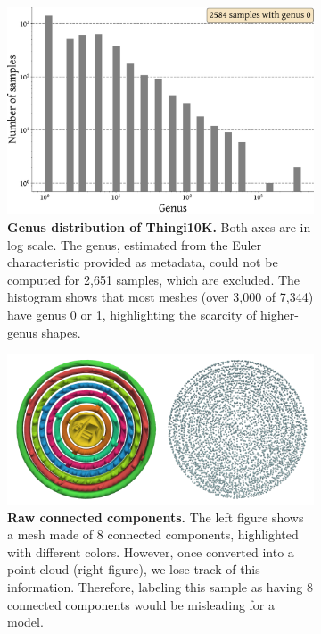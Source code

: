 \begin{figure}[h]
  \centering
  \begin{subfigure}[t]{0.40\linewidth}
    \centering
    \includegraphics[width=\linewidth]{figs/topogen/thingi_genus_hist.pdf}
    \caption{\textbf{Genus distribution of Thingi10K.} Both axes are in log scale. The genus, estimated from the Euler characteristic provided as metadata, could not be computed for 2,651 samples, which are excluded. The histogram shows that most meshes (over 3,000 of 7,344) have genus 0 or 1, highlighting the scarcity of higher-genus shapes.}
    \label{fig:thingi-genus}
  \end{subfigure}
  \hfill
  \begin{subfigure}[t]{0.58\linewidth}
    \centering
    \includegraphics[width=\linewidth]{figs/connected_comps_thingi.pdf}
    \caption{\textbf{Raw connected components.} The left figure shows a mesh made of 8 connected components, highlighted with different colors. However, once converted into a point cloud (right figure), we lose track of this information. Therefore, labeling this sample as having 8 connected components would be misleading for a model.}
    \label{fig:thingi-comps}
  \end{subfigure}
  \caption{}
  \label{fig:thingi-overview}
\end{figure}

